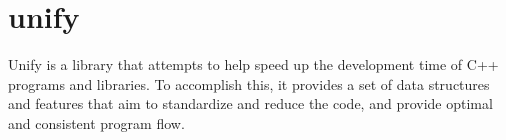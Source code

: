 \chapter{unify}
\hypertarget{md__r_e_a_d_m_e}{}\label{md__r_e_a_d_m_e}
\label{md__r_e_a_d_m_e_autotoc_md0}%
%
Unify is a library that attempts to help speed up the development time of C++ programs and libraries. To accomplish this, it provides a set of data structures and features that aim to standardize and reduce the code, and provide optimal and consistent program flow. 